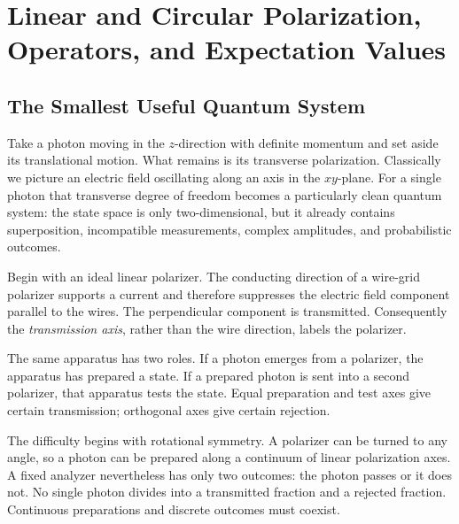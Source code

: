 \chapter{Linear and Circular Polarization, Operators, and Expectation Values}

\section{The Smallest Useful Quantum System}

Take a photon moving in the \(z\)-direction with definite momentum and set
aside its translational motion. What remains is its transverse polarization.
Classically we picture an electric field oscillating along an axis in the
\(xy\)-plane. For a single photon that transverse degree of freedom becomes
a particularly clean quantum system: the state space is only
two-dimensional, but it already contains superposition, incompatible
measurements, complex amplitudes, and probabilistic outcomes.

Begin with an ideal linear polarizer. The conducting direction of a
wire-grid polarizer supports a current and therefore suppresses the electric
field component parallel to the wires. The perpendicular component is
transmitted. Consequently the \emph{transmission axis}, rather than the wire
direction, labels the polarizer.

The same apparatus has two roles. If a photon emerges from a polarizer, the
apparatus has prepared a state. If a prepared photon is sent into a second
polarizer, that apparatus tests the state. Equal preparation and test axes
give certain transmission; orthogonal axes give certain rejection.

\begin{classroomqa}
\end{classroomqa}

The difficulty begins with rotational symmetry. A polarizer can be turned
to any angle, so a photon can be prepared along a continuum of linear
polarization axes. A fixed analyzer nevertheless has only two outcomes:
the photon passes or it does not. No single photon divides into a
transmitted fraction and a rejected fraction. Continuous preparations and
discrete outcomes must coexist.

